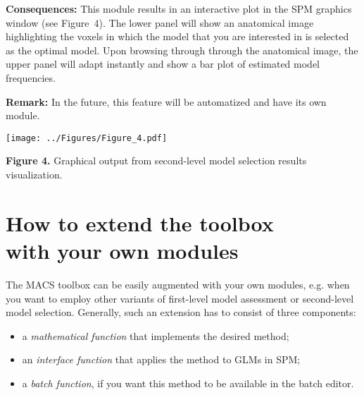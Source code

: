\documentclass[a4paper,12pt]{article}
\begin{document}
\textbf{Consequences:} This module results in an interactive plot in the SPM graphics window (see Figure~4). The lower panel will show an anatomical image highlighting the voxels in which the model that you are interested in is selected as the optimal model. Upon browsing through through the anatomical image, the upper panel will adapt instantly and show a bar plot of estimated model frequencies.

\textbf{Remark:} In the future, this feature will be automatized and have its own module.

\pagebreak
\vspace{1em}
\begin{flushleft}
\texttt{[image: ../Figures/Figure\_4.pdf]}
\end{flushleft}
\vspace{-1em}

\textbf{Figure 4.} Graphical output from second-level model selection results visualization.



\pagebreak
{}
\section[How to extend the toolbox with your own modules]{How to extend the toolbox \\ with your own modules} \label{sec:MACS-ext}

The MACS toolbox can be easily augmented with your own modules, e.g. when you want to employ other variants of first-level model assessment or second-level model selection. Generally, such an extension has to consist of three components:

\begin{itemize}
	
\item
a \textit{mathematical function} that implements the desired method;

\item
an \textit{interface function} that applies the method to GLMs in SPM;

\item
a \textit{batch function}, if you want this method to be available in the batch editor.
	
\end{itemize}
\end{document}
